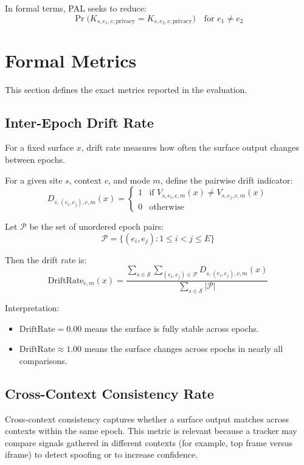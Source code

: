 \documentclass[11pt]{report}
\begin{document}
In formal terms, PAL seeks to reduce:
\[
\Pr\Big(K_{s,e_1,c,\text{privacy}} = K_{s,e_2,c,\text{privacy}}\Big)
\quad \text{for } e_1 \ne e_2
\]

\section{Formal Metrics}

This section defines the exact metrics reported in the evaluation.

\subsection{Inter-Epoch Drift Rate}

For a fixed surface $x$, drift rate measures how often the surface output changes between epochs.

For a given site $s$, context $c$, and mode $m$, define the pairwise drift indicator:
\[
D_{s,(e_i,e_j),c,m}(x) =
\begin{cases}
1 & \text{if } V_{s,e_i,c,m}(x) \ne V_{s,e_j,c,m}(x) \\
0 & \text{otherwise}
\end{cases}
\]

Let $\mathcal{P}$ be the set of unordered epoch pairs:
\[
\mathcal{P} = \{(e_i,e_j) : 1 \le i < j \le E\}
\]

Then the drift rate is:
\[
\text{DriftRate}_{c,m}(x) =
\frac{\sum_{s \in \mathcal{S}} \sum_{(e_i,e_j)\in\mathcal{P}} D_{s,(e_i,e_j),c,m}(x)}
{\sum_{s \in \mathcal{S}} |\mathcal{P}|}
\]

Interpretation:
\begin{itemize}
    \item $\text{DriftRate}=0.00$ means the surface is fully stable across epochs.
    \item $\text{DriftRate}\approx 1.00$ means the surface changes across epochs in nearly all comparisons.
\end{itemize}

\subsection{Cross-Context Consistency Rate}

Cross-context consistency captures whether a surface output matches across contexts within the same epoch. This metric is relevant because a tracker may compare signals gathered in different contexts (for example, top frame versus iframe) to detect spoofing or to increase confidence.
\end{document}
